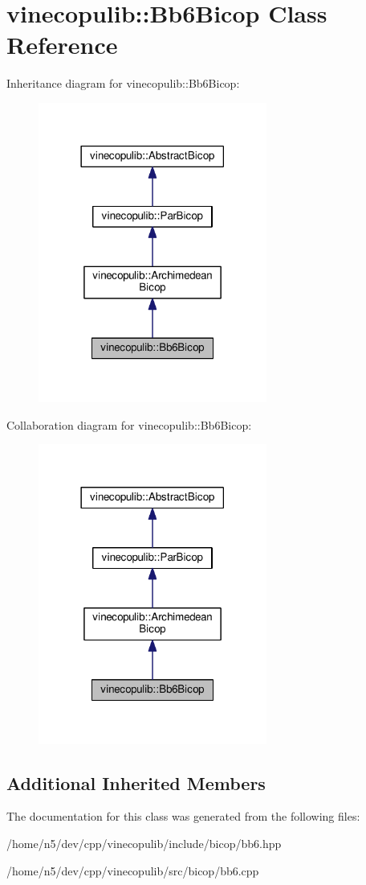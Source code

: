 \hypertarget{classvinecopulib_1_1_bb6_bicop}{}\section{vinecopulib\+:\+:Bb6\+Bicop Class Reference}
\label{classvinecopulib_1_1_bb6_bicop}


Inheritance diagram for vinecopulib\+:\+:Bb6\+Bicop\+:\nopagebreak
\begin{figure}[H]
\begin{center}
\leavevmode
\includegraphics[width=213pt]{classvinecopulib_1_1_bb6_bicop__inherit__graph}
\end{center}
\end{figure}


Collaboration diagram for vinecopulib\+:\+:Bb6\+Bicop\+:\nopagebreak
\begin{figure}[H]
\begin{center}
\leavevmode
\includegraphics[width=213pt]{classvinecopulib_1_1_bb6_bicop__coll__graph}
\end{center}
\end{figure}
\subsection*{Additional Inherited Members}


The documentation for this class was generated from the following files\+:\begin{DoxyCompactItemize}
\item 
/home/n5/dev/cpp/vinecopulib/include/bicop/bb6.\+hpp\item 
/home/n5/dev/cpp/vinecopulib/src/bicop/bb6.\+cpp\end{DoxyCompactItemize}
